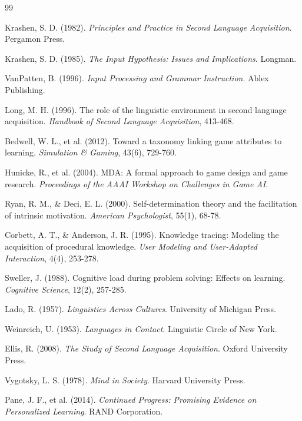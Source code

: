 \documentclass[12pt,a4paper]{article}
\begin{document}
\begin{thebibliography}{99}

Krashen, S. D. (1982). \textit{Principles and Practice in Second Language Acquisition}. Pergamon Press.

Krashen, S. D. (1985). \textit{The Input Hypothesis: Issues and Implications}. Longman.

VanPatten, B. (1996). \textit{Input Processing and Grammar Instruction}. Ablex Publishing.

Long, M. H. (1996). The role of the linguistic environment in second language acquisition. \textit{Handbook of Second Language Acquisition}, 413-468.

Bedwell, W. L., et al. (2012). Toward a taxonomy linking game attributes to learning. \textit{Simulation \& Gaming}, 43(6), 729-760.

Hunicke, R., et al. (2004). MDA: A formal approach to game design and game research. \textit{Proceedings of the AAAI Workshop on Challenges in Game AI}.

Ryan, R. M., \& Deci, E. L. (2000). Self-determination theory and the facilitation of intrinsic motivation. \textit{American Psychologist}, 55(1), 68-78.

Corbett, A. T., \& Anderson, J. R. (1995). Knowledge tracing: Modeling the acquisition of procedural knowledge. \textit{User Modeling and User-Adapted Interaction}, 4(4), 253-278.

Sweller, J. (1988). Cognitive load during problem solving: Effects on learning. \textit{Cognitive Science}, 12(2), 257-285.

Lado, R. (1957). \textit{Linguistics Across Cultures}. University of Michigan Press.

Weinreich, U. (1953). \textit{Languages in Contact}. Linguistic Circle of New York.

Ellis, R. (2008). \textit{The Study of Second Language Acquisition}. Oxford University Press.

Vygotsky, L. S. (1978). \textit{Mind in Society}. Harvard University Press.

Pane, J. F., et al. (2014). \textit{Continued Progress: Promising Evidence on Personalized Learning}. RAND Corporation.

\end{thebibliography}
\end{document}
